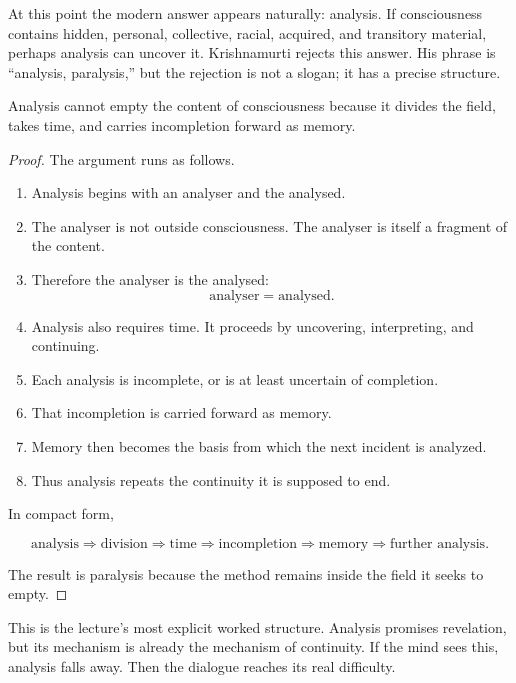 At this point the modern answer appears naturally: analysis. If consciousness contains hidden, personal, collective, racial, acquired, and transitory material, perhaps analysis can uncover it. Krishnamurti rejects this answer. His phrase is ``analysis, paralysis,'' but the rejection is not a slogan; it has a precise structure.

\begin{proposition}
Analysis cannot empty the content of consciousness because it divides the field, takes time, and carries incompletion forward as memory.
\end{proposition}

\begin{proof}
The argument runs as follows.

\begin{enumerate}
\item Analysis begins with an analyser and the analysed.
\item The analyser is not outside consciousness. The analyser is itself a fragment of the content.
\item Therefore the analyser is the analysed:
\begin{equation}
\text{analyser} = \text{analysed}.
\end{equation}
\item Analysis also requires time. It proceeds by uncovering, interpreting, and continuing.
\item Each analysis is incomplete, or is at least uncertain of completion.
\item That incompletion is carried forward as memory.
\item Memory then becomes the basis from which the next incident is analyzed.
\item Thus analysis repeats the continuity it is supposed to end.
\end{enumerate}

In compact form,

\begin{equation}
\text{analysis}
\Rightarrow
\text{division}
\Rightarrow
\text{time}
\Rightarrow
\text{incompletion}
\Rightarrow
\text{memory}
\Rightarrow
\text{further analysis}.
\end{equation}

The result is paralysis because the method remains inside the field it seeks to empty.
\end{proof}

This is the lecture's most explicit worked structure. Analysis promises revelation, but its mechanism is already the mechanism of continuity. If the mind sees this, analysis falls away. Then the dialogue reaches its real difficulty.

